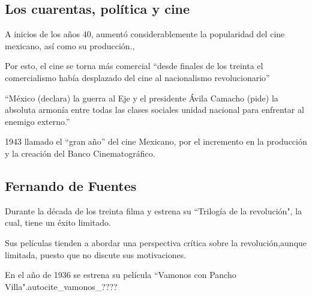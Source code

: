 \subsection{Los cuarentas, política y cine}
\begin{compactitem}
     \item 
     A inicios de los años 40, aumentó considerablemente la popularidad del cine mexicano, así como su producción.\autocite[522]{peter_desarrollo_2008}, 
     \item Por esto, el cine se torna más comercial ``desde finales de los treinta  el comercialismo había desplazado del cine al nacionalismo revolucionario''\autocite[443]{monsivais_notas_????}
     \item
     ``México (declara) la guerra al Eje y el presidente Ávila Camacho (pide) la absoluta armonía entre todas las clases 
     sociales unidad nacional para enfrentar al enemigo externo.''\autocite[116]{piedras_narrativas_2012}
     \item 
     1943 llamado el ``gran año'' del cine Mexicano, por el incremento en la producción y la creación del Banco Cinematográfico. %

\end{compactitem} 

\subsection{Fernando de Fuentes}
    \begin{compactitem}
        \item Durante la década de los treinta filma y estrena su ``Trilogía
        de la revolución", la cual, tiene un éxito limitado.\autocite{piedras_narrativas_2012}
        \item Sus películas tienden a abordar una perspectiva crítica sobre la revolución,aunque limitada, puesto que no discute sus motivaciones. \autocite[113]{piedras_narrativas_2012}
        \item En el año de 1936 se estrena su película ``Vamonos
        con Pancho Villa"\autocite{fernandez_vamonos_1936}.autocite{_vamonos_????}
    \end{compactitem} 

